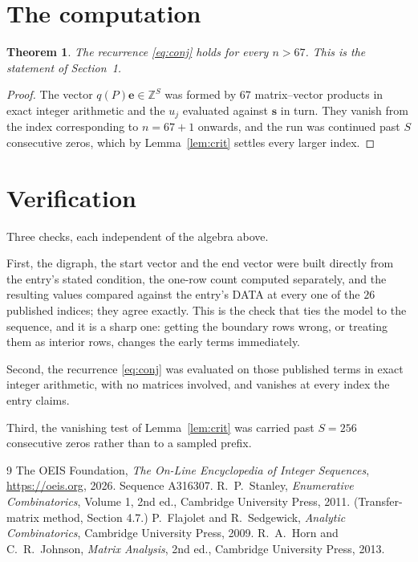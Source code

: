 \documentclass[11pt,a4paper]{article}
\theoremstyle{plain}
\newtheorem{theorem}{Theorem}
\theoremstyle{definition}
\begin{document}
\section{The computation}

\begin{theorem}
The recurrence \eqref{eq:conj} holds for every $n>67$. This is the statement of
Section~1.
\end{theorem}

\begin{proof}
The vector $q(P)\mathbf{e}\in\mathbb{Z}^{S}$ was formed by $67$ matrix--vector
products in exact integer arithmetic and the $u_j$ evaluated against $\mathbf{s}$ in turn.
They vanish from the index corresponding to $n=67+1$ onwards, and the run was continued
past $S$ consecutive zeros, which by Lemma~\ref{lem:crit} settles every larger index.
\end{proof}

\section{Verification}

Three checks, each independent of the algebra above.

First, the digraph, the start vector and the end vector were built directly from the
entry's stated condition, the one-row count computed separately, and the resulting values
compared against the entry's DATA at every one of the $26$ published indices; they
agree exactly. This is the check that ties the model to the sequence, and it is a sharp one:
getting the boundary rows wrong, or treating them as interior rows, changes the early terms
immediately.

Second, the recurrence \eqref{eq:conj} was evaluated on those published terms in exact
integer arithmetic, with no matrices involved, and vanishes at every index the entry claims.

Third, the vanishing test of Lemma~\ref{lem:crit} was carried past $S=256$ consecutive
zeros rather than to a sampled prefix.

\begin{thebibliography}{9}
 The OEIS Foundation, \emph{The On-Line Encyclopedia of Integer
Sequences}, \url{https://oeis.org}, 2026. Sequence A316307.
 R.~P.~Stanley, \emph{Enumerative Combinatorics}, Volume 1, 2nd ed.,
Cambridge University Press, 2011. (Transfer-matrix method, Section 4.7.)
 P.~Flajolet and R.~Sedgewick, \emph{Analytic Combinatorics}, Cambridge
University Press, 2009.
 R.~A.~Horn and C.~R.~Johnson, \emph{Matrix Analysis}, 2nd ed., Cambridge
University Press, 2013.
\end{thebibliography}
\end{document}
